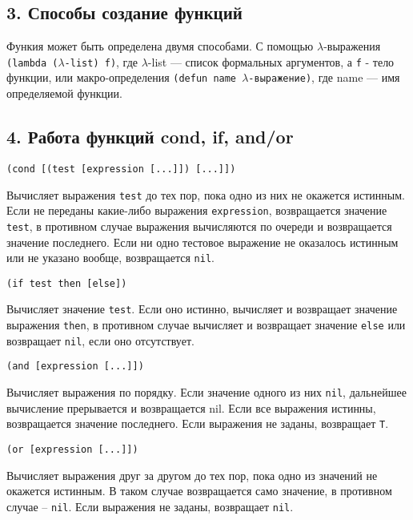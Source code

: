 \subsection*{3. Способы создание функций}

Функия может быть определена двумя способами. С помощью $\lambda$-выражения
\verb|(lambda (|$\lambda$\verb|-list) f)|, где $\lambda$-list --- список
формальных аргументов, а \verb|f| - тело функции, или макро-определения
\verb|(defun name |$\lambda$\verb|-выражение)|, где name --- имя определяемой
функции.

\subsection*{4. Работа функций cond, if, and/or}

\verb|(cond [(test [expression [...]]) [...]])|

Вычисляет выражения \verb|test| до тех пор, пока одно из них не окажется
истинным. Если не переданы какие-либо выражения \verb|expression|, возвращается
значение \verb|test|, в противном случае выражения вычисляются по очереди и
возвращается значение последнего. Если ни одно тестовое выражение не оказалось
истинным или не указано вообще, возвращается \verb|nil|.

\verb|(if test then [else])|

Вычисляет значение \verb|test|. Если оно истинно, вычисляет и возвращает
значение выражения \verb|then|, в противном случае вычисляет и возвращает
значение \verb|else| или возвращает \verb|nil|, если оно отсутствует.

\verb|(and [expression [...]])|

Вычисляет выражения по порядку. Если значение одного из них \verb|nil|,
дальнейшее вычисление прерывается и возвращается nil. Если все выражения
истинны, возвращается значение последнего. Если выражения не заданы, возвращает
\verb|T|.

\verb|(or [expression [...]])|

Вычисляет выражения друг за другом до тех пор, пока одно из значений не
окажется истинным. В таком случае возвращается само значение, в противном
случае – \verb|nil|. Если выражения не заданы, возвращает \verb|nil|.

